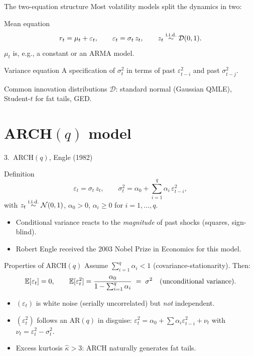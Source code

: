 \documentclass[aspectratio=169]{beamer}
\begin{document}
\begin{frame}{The two-equation structure}
  Most volatility models split the dynamics in two:
  \begin{block}{Mean equation}
    \[
      r_t = \mu_t + \varepsilon_t,
      \qquad
      \varepsilon_t = \sigma_t\, z_t,
      \qquad
      z_t \overset{\text{i.i.d.}}{\sim} \mathcal D(0, 1).
    \]
    $\mu_t$ is, e.g., a constant or an ARMA model.
  \end{block}
  \begin{block}{Variance equation}
    A specification of $\sigma_t^2$ in terms of past
    $\varepsilon_{t-i}^2$ and past $\sigma_{t-j}^2$.
  \end{block}
  \pause
  Common innovation distributions $\mathcal D$: standard normal
  (Gaussian QMLE), Student-$t$ for fat tails, GED.
\end{frame}

\section{ARCH$(q)$ model}

\begin{frame}{3.~ARCH$(q)$, Engle (1982)}
  \begin{block}{Definition}
    \[
      \varepsilon_t = \sigma_t\, z_t,
      \qquad
      \sigma_t^2 = \alpha_0
                  + \sum_{i = 1}^{q} \alpha_i\, \varepsilon_{t-i}^2,
    \]
    with $z_t \overset{\text{i.i.d.}}{\sim} \mathcal N(0, 1)$, $\alpha_0 > 0$,
    $\alpha_i \geq 0$ for $i = 1, \dots, q$.
  \end{block}
  \pause
  \begin{itemize}
    \item Conditional variance reacts to the \emph{magnitude} of
          past shocks (squares, sign-blind).
    \item Robert Engle received the 2003 Nobel Prize in Economics
          for this model.
  \end{itemize}
\end{frame}

\begin{frame}{Properties of ARCH$(q)$}
  Assume $\sum_{i=1}^{q} \alpha_i < 1$ (covariance-stationarity).
  Then:
  \[
    \mathbb{E}[\varepsilon_t] = 0,
    \qquad
    \mathbb{E}[\varepsilon_t^2] = \frac{\alpha_0}{1 - \sum_{i = 1}^{q} \alpha_i}
        \;=\; \sigma^2 \quad (\text{unconditional variance}).
  \]
  \pause
  \begin{itemize}
    \item $(\varepsilon_t)$ is white noise (serially uncorrelated)
          but \emph{not} independent.
    \item $(\varepsilon_t^2)$ follows an AR$(q)$ in disguise:
          $\varepsilon_t^2 = \alpha_0 + \sum \alpha_i
          \varepsilon_{t-i}^2 + \nu_t$ with $\nu_t = \varepsilon_t^2
          - \sigma_t^2$.
    \item Excess kurtosis $\widehat\kappa > 3$: ARCH naturally
          generates fat tails.
  \end{itemize}
\end{frame}
\end{document}
